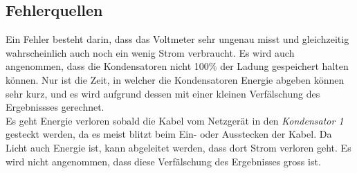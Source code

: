 \documentclass[a4paper,12pt]{article}
\begin{document}






\subsection{Fehlerquellen}

Ein Fehler besteht darin, dass das Voltmeter sehr ungenau misst und gleichzeitig wahrscheinlich auch noch ein wenig Strom verbraucht. Es wird auch angenommen, dass die Kondensatoren nicht 100\% der Ladung gespeichert halten können. Nur ist die Zeit, in welcher die Kondensatoren Energie abgeben können sehr kurz, und es wird aufgrund dessen mit einer kleinen Verfälschung des Ergebnissses gerechnet.\\

Es geht Energie verloren sobald die Kabel vom Netzgerät in den \textit{Kondensator 1} gesteckt werden, da es meist blitzt beim Ein- oder Ausstecken der Kabel. Da Licht auch Energie ist, kann abgeleitet werden, dass dort Strom verloren geht. Es wird nicht angenommen, dass diese Verfälschung des Ergebnisses gross ist.\\
\end{document}
